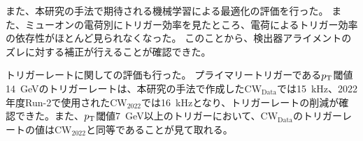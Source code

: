 また、本研究の手法で期待される機械学習による最適化の評価を行った。
また、ミューオンの電荷別にトリガー効率を見たところ、電荷によるトリガー効率の依存性がほとんど見られなくなった。
このことから、検出器アライメントのズレに対する補正が行えることが確認できた。

トリガーレートに関しての評価も行った。
プライマリートリガーである$p_{\rm{T}}$閾値14~GeVのトリガーレートは、本研究の手法で作成した$\mathrm{CW_{Data}}$では15~kHz、2022年度Run-2で使用された$\mathrm{CW_{2022}}$では16~kHzとなり、トリガーレートの削減が確認できた。また、$p_{\rm{T}}$閾値7~GeV以上のトリガーにおいて、$\mathrm{CW_{Data}}$のトリガーレートの値は$\mathrm{CW_{2022}}$と同等であることが見て取れる。


